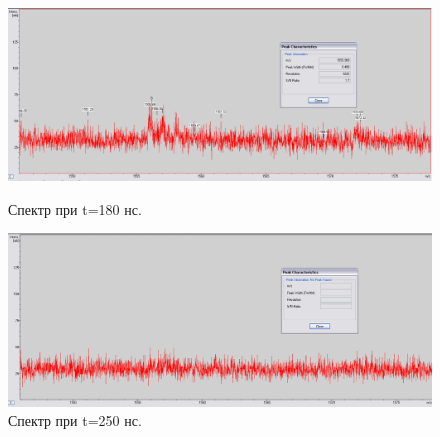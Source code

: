 \documentclass[12pt]{article}
\begin{document}
\begin{flushleft}
\begin{figure}[!h]
\begin{center}
\begin{minipage}[h]{0.4\linewidth}
\includegraphics[width=1.2\linewidth]{24}
\caption{Спектр при t=180 нс.} %
\label{ris:experimoriginal} %
\end{minipage}
\hfill 
\begin{minipage}[h]{0.4\linewidth}
\includegraphics[width=1.2\linewidth]{25}
\caption{Спектр при t=250 нс.}
\label{ris:experimcoded}
\end{minipage}
\end{center}
\end{figure}
\newpage


\end{flushleft}
\end{document}
